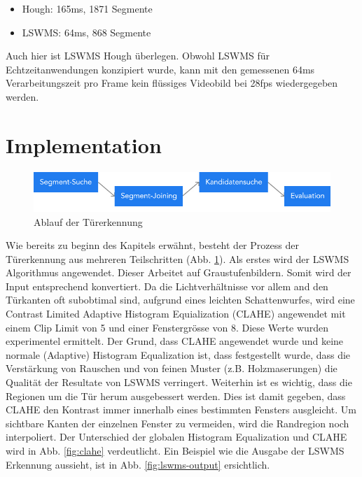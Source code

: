 \begin{itemize}
	\item Hough: 165ms, 1871 Segmente
	\item LSWMS: 64ms, 868 Segmente
\end{itemize}
\noindent
Auch hier ist LSWMS Hough überlegen. Obwohl LSWMS für Echtzeitanwendungen konzipiert wurde, kann mit den gemessenen 64ms Verarbeitungszeit pro Frame kein flüssiges Videobild bei 28fps wiedergegeben werden.

\section{Implementation}

\begin{figure}[!ht]
\centering
\includegraphics[width=\textwidth]{images/door-detection} 
\caption{Ablauf der Türerkennung}
\label{fig:door-detection}
\end{figure}
\noindent
Wie bereits zu beginn des Kapitels erwähnt, besteht der Prozess der Türerkennung aus mehreren Teilschritten (Abb. \ref{fig:door-detection}). Als erstes wird der LSWMS Algorithmus angewendet. Dieser Arbeitet auf Graustufenbildern. Somit wird der Input entsprechend konvertiert. Da die Lichtverhältnisse vor allem and den Türkanten oft subobtimal sind, aufgrund eines leichten Schattenwurfes, wird eine Contrast Limited Adaptive Histogram Equialization (CLAHE) angewendet mit einem Clip Limit von 5 und einer Fenstergrösse von 8. Diese Werte wurden experimentel ermittelt. Der Grund, dass CLAHE angewendet wurde und keine normale (Adaptive) Histogram Equalization ist, dass festgestellt wurde, dass die Verstärkung von Rauschen und von feinen Muster (z.B. Holzmaserungen) die Qualität der Resultate von LSWMS verringert. Weiterhin ist es wichtig, dass die Regionen um die Tür herum ausgebessert werden. Dies ist damit gegeben, dass CLAHE den Kontrast immer innerhalb eines bestimmten Fensters ausgleicht. Um sichtbare Kanten der einzelnen Fenster zu vermeiden, wird die Randregion noch interpoliert. Der Unterschied der globalen Histogram Equalization und CLAHE wird in Abb. \ref{fig:clahe} verdeutlicht. Ein Beispiel wie die Ausgabe der LSWMS Erkennung aussieht, ist in Abb. \ref{fig:lswms-output} ersichtlich.

